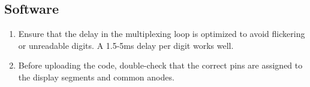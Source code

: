 \documentclass[journal]{IEEEtran}
\begin{document}
\subsection{Software}
\begin{enumerate}
    \item  Ensure that the delay in the multiplexing loop is optimized to avoid flickering or unreadable digits. A 1.5-5ms delay per digit works well.
    \item Before uploading the code, double-check that the correct pins are assigned to the display segments and common anodes.
\end{enumerate}
\end{document}

